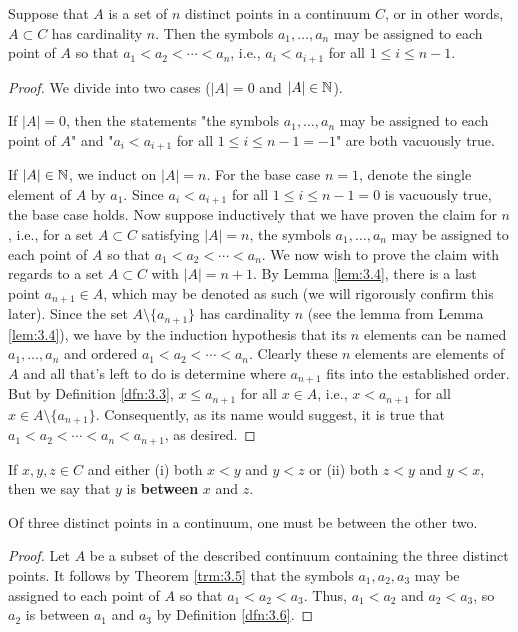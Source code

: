 \documentclass[../main.tex]{subfiles}
\begin{document}
\begin{theorem}\label{trm:3.5}
    Suppose that $A$ is a set of $n$ distinct points in a continuum $C$, or in other words, $A\subset C$ has cardinality $n$. Then the symbols $a_1,\dots,a_n$ may be assigned to each point of $A$ so that $a_1<a_2<\cdots<a_n$, i.e., $a_i<a_{i+1}$ for all $1\leq i\leq n-1$.
    \begin{proof}
        We divide into two cases ($|A|=0$ and $|A|\in\mathbb{N}$).\par
        If $|A|=0$, then the statements "the symbols $a_1,\dots,a_n$ may be assigned to each point of $A$" and "$a_i<a_{i+1}$ for all $1\leq i\leq n-1=-1$" are both vacuously true.\par
        If $|A|\in\mathbb{N}$, we induct on $|A|=n$. For the base case $n=1$, denote the single element of $A$ by $a_1$. Since $a_i<a_{i+1}$ for all $1\leq i\leq n-1=0$ is vacuously true, the base case holds. Now suppose inductively that we have proven the claim for $n$, i.e., for a set $A\subset C$ satisfying $|A|=n$, the symbols $a_1,\dots,a_n$ may be assigned to each point of $A$ so that $a_1<a_2<\cdots<a_n$. We now wish to prove the claim with regards to a set $A\subset C$ with $|A|=n+1$. By Lemma \ref{lem:3.4}, there is a last point $a_{n+1}\in A$, which may be denoted as such (we will rigorously confirm this later). Since the set $A\setminus\{a_{n+1}\}$ has cardinality $n$ (see the lemma from Lemma \ref{lem:3.4}), we have by the induction hypothesis that its $n$ elements can be named $a_1,\dots,a_n$ and ordered $a_1<a_2<\cdots<a_n$. Clearly these $n$ elements are elements of $A$ and all that's left to do is determine where $a_{n+1}$ fits into the established order. But by Definition \ref{dfn:3.3}, $x\leq a_{n+1}$ for all $x\in A$, i.e., $x<a_{n+1}$ for all $x\in A\setminus\{a_{n+1}\}$. Consequently, as its name would suggest, it is true that $a_1<a_2<\cdots<a_n<a_{n+1}$, as desired.
    \end{proof}
\end{theorem}

\begin{definition}\label{dfn:3.6}
    If $x,y,z\in C$ and either (i) both $x<y$ and $y<z$ or (ii) both $z<y$ and $y<x$, then we say that $y$ is \textbf{between} $x$ and $z$.
\end{definition}

\begin{corollary}\label{cly:3.7}
    Of three distinct points in a continuum, one must be between the other two.
    \begin{proof}
        Let $A$ be a subset of the described continuum containing the three distinct points. It follows by Theorem \ref{trm:3.5} that the symbols $a_1,a_2,a_3$ may be assigned to each point of $A$ so that $a_1<a_2<a_3$. Thus, $a_1<a_2$ and $a_2<a_3$, so $a_2$ is between $a_1$ and $a_3$ by Definition \ref{dfn:3.6}.
    \end{proof}
\end{corollary}
\end{document}
